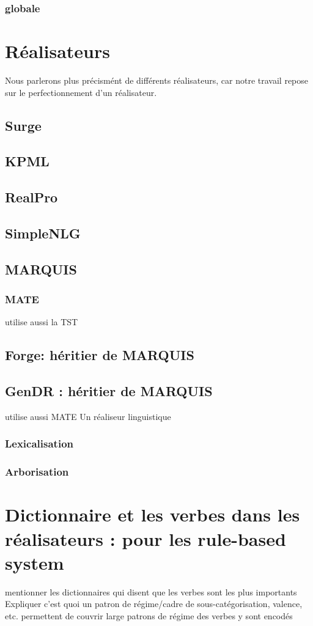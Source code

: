 \subsubsection{globale}

\section{Réalisateurs}

Nous parlerons plus précismént de différents réalisateurs, car notre travail repose sur le perfectionnement d'un réalisateur. 

\subsection{Surge}

\subsection{KPML}

\subsection{RealPro}

\subsection{SimpleNLG}

\subsection{MARQUIS}
\subsubsection{MATE}
utilise aussi la TST

\subsection{Forge: héritier de MARQUIS}

\subsection{GenDR : héritier de MARQUIS}
utilise aussi MATE
Un réaliseur linguistique
\subsubsection{Lexicalisation}
\subsubsection{Arborisation}

\section{Dictionnaire et les verbes dans les réalisateurs : pour les rule-based system}
mentionner les dictionnaires qui disent que les verbes sont les plus importants
Expliquer c'est quoi un patron de régime/cadre de sous-catégorisation, valence, etc.
permettent de couvrir large
patrons de régime des verbes y sont encodés
